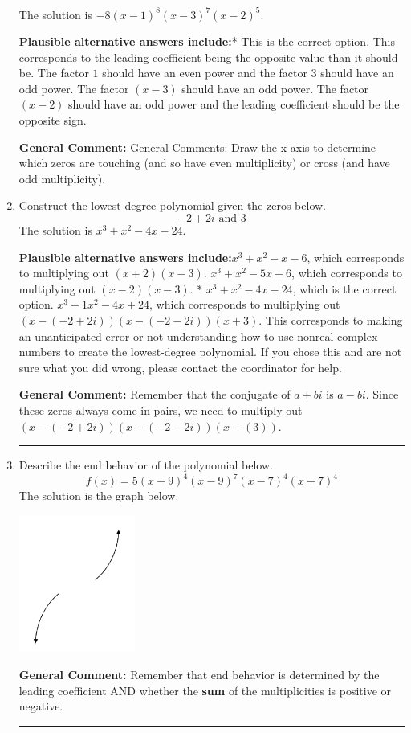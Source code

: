 \documentclass{extbook}[14pt]
\newcommand{\litem}[1]{\item #1

\rule{\textwidth}{0.4pt}}
\begin{document}
\begin{enumerate}
{The solution is \( -8(x - 1)^{8} (x - 3)^{7} (x - 2)^{5} \).\begin{enumerate}[label=\Alph*.]
\textbf{Plausible alternative answers include:}* This is the correct option.
This corresponds to the leading coefficient being the opposite value than it should be.
The factor $1$ should have an even power and the factor $3$ should have an odd power.
The factor $(x - 3)$ should have an odd power.
The factor $(x - 2)$ should have an odd power and the leading coefficient should be the opposite sign.
\end{enumerate}

\textbf{General Comment:} General Comments: Draw the x-axis to determine which zeros are touching (and so have even multiplicity) or cross (and have odd multiplicity).
}
\litem{
Construct the lowest-degree polynomial given the zeros below.
\[ -2 + 2 i \text{ and } 3 \]The solution is \( x^{3} + x^{2} -4 x -24 \).\begin{enumerate}[label=\Alph*.]
\textbf{Plausible alternative answers include:}$x^{3} + x^{2} -x -6$, which corresponds to multiplying out $(x + 2)(x -3)$.
$x^{3} + x^{2} -5 x + 6$, which corresponds to multiplying out $(x -2)(x -3)$.
* $x^{3} + x^{2} -4 x -24$, which is the correct option.
$x^{3} -1 x^{2} -4 x + 24$, which corresponds to multiplying out $(x-(-2 + 2 i))(x-(-2 - 2 i))(x + 3)$.
This corresponds to making an unanticipated error or not understanding how to use nonreal complex numbers to create the lowest-degree polynomial. If you chose this and are not sure what you did wrong, please contact the coordinator for help.
\end{enumerate}

\textbf{General Comment:} Remember that the conjugate of $a+bi$ is $a-bi$. Since these zeros always come in pairs, we need to multiply out $(x-(-2 + 2 i))(x-(-2 - 2 i))(x-(3))$.
}
\litem{
Describe the end behavior of the polynomial below.
\[ f(x) = 5(x + 9)^{4}(x - 9)^{7}(x - 7)^{4}(x + 7)^{4} \]The solution is the graph below.
    \begin{center}
        \includegraphics[width=0.3\textwidth]{../Figures/polyEndBehaviorDB.png}
    \end{center}

\textbf{General Comment:} Remember that end behavior is determined by the leading coefficient AND whether the \textbf{sum} of the multiplicities is positive or negative.
}
\end{enumerate}
\end{document}
